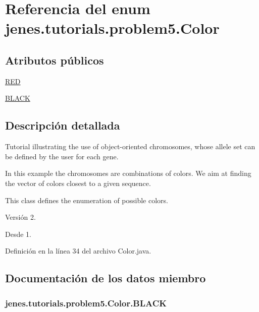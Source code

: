 \hypertarget{enumjenes_1_1tutorials_1_1problem5_1_1_color}{\section{Referencia del enum jenes.\-tutorials.\-problem5.\-Color}
\label{enumjenes_1_1tutorials_1_1problem5_1_1_color}
}
\subsection*{Atributos públicos}
\begin{DoxyCompactItemize}
\item 
\hyperlink{enumjenes_1_1tutorials_1_1problem5_1_1_color_a820ec36787044c1681e2768b18a4a38e}{R\-E\-D}
\item 
\hyperlink{enumjenes_1_1tutorials_1_1problem5_1_1_color_a6628df3180f62635a91cb1cd749af195}{B\-L\-A\-C\-K}
\end{DoxyCompactItemize}


\subsection{Descripción detallada}
Tutorial illustrating the use of object-\/oriented chromosomes, whose allele set can be defined by the user for each gene.

In this example the chromosomes are combinations of colors. We aim at finding the vector of colors closest to a given sequence.

This class defines the enumeration of possible colors.

\begin{DoxyVersion}{Versión}
2. 
\end{DoxyVersion}
\begin{DoxySince}{Desde}
1. 
\end{DoxySince}


Definición en la línea 34 del archivo Color.\-java.



\subsection{Documentación de los datos miembro}
\hypertarget{enumjenes_1_1tutorials_1_1problem5_1_1_color_a6628df3180f62635a91cb1cd749af195}{
\subsubsection[{B\-L\-A\-C\-K}]{\setlength{\rightskip}{0pt plus 5cm}jenes.\-tutorials.\-problem5.\-Color.\-B\-L\-A\-C\-K}}\label{enumjenes_1_1tutorials_1_1problem5_1_1_color_a6628df3180f62635a91cb1cd749af195}



